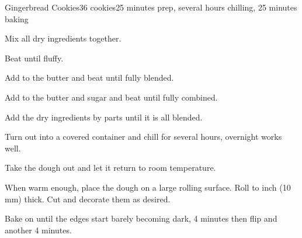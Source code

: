 \documentclass[../Cookbook.tex]{subfiles}
\begin{document}
\begin{recipe}{Gingerbread Cookies}{36 cookies}{25 minutes prep, several hours chilling, 25 minutes baking}

	Mix all dry ingredients together.

	Beat until fluffy.

	Add to the butter and beat until fully blended.

	Add to the butter and sugar and beat until fully combined.

	Add the dry ingredients by parts until it is all blended.

	Turn out into a covered container and chill for several hours, overnight works well.

	\newstep
	Take the dough out and let it return to room temperature.

	When warm enough, place the dough on a large rolling surface.
	Roll to  inch (10 mm) thick.
	Cut and decorate them as desired.

	\newstep
	Bake on  until the edges start barely becoming dark,
	4 minutes then flip and another 4 minutes.


\end{recipe}
\end{document}
